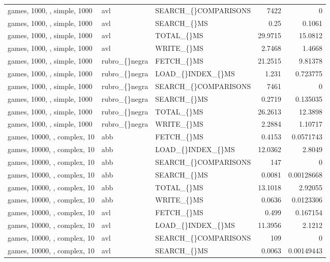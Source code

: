 \begin{longtable}{p{4cm}p{1.4cm}p{2.6cm}rr}
games, 1000, , simple, 1000 & avl & SEARCH\_\allowbreak\{\}COMPARISONS & 7422 & 0\\
games, 1000, , simple, 1000 & avl & SEARCH\_\allowbreak\{\}MS & 0.25 & 0.1061\\
games, 1000, , simple, 1000 & avl & TOTAL\_\allowbreak\{\}MS & 29.9715 & 15.0812\\
games, 1000, , simple, 1000 & avl & WRITE\_\allowbreak\{\}MS & 2.7468 & 1.4668\\
games, 1000, , simple, 1000 & rubro\_\allowbreak\{\}negra & FETCH\_\allowbreak\{\}MS & 21.2515 & 9.81378\\
games, 1000, , simple, 1000 & rubro\_\allowbreak\{\}negra & LOAD\_\allowbreak\{\}INDEX\_\allowbreak\{\}MS & 1.231 & 0.723775\\
games, 1000, , simple, 1000 & rubro\_\allowbreak\{\}negra & SEARCH\_\allowbreak\{\}COMPARISONS & 7461 & 0\\
games, 1000, , simple, 1000 & rubro\_\allowbreak\{\}negra & SEARCH\_\allowbreak\{\}MS & 0.2719 & 0.135035\\
games, 1000, , simple, 1000 & rubro\_\allowbreak\{\}negra & TOTAL\_\allowbreak\{\}MS & 26.2613 & 12.3898\\
games, 1000, , simple, 1000 & rubro\_\allowbreak\{\}negra & WRITE\_\allowbreak\{\}MS & 2.2884 & 1.10717\\
games, 10000, , complex, 10 & abb & FETCH\_\allowbreak\{\}MS & 0.4153 & 0.0571743\\
games, 10000, , complex, 10 & abb & LOAD\_\allowbreak\{\}INDEX\_\allowbreak\{\}MS & 12.0362 & 2.8049\\
games, 10000, , complex, 10 & abb & SEARCH\_\allowbreak\{\}COMPARISONS & 147 & 0\\
games, 10000, , complex, 10 & abb & SEARCH\_\allowbreak\{\}MS & 0.0081 & 0.00128668\\
games, 10000, , complex, 10 & abb & TOTAL\_\allowbreak\{\}MS & 13.1018 & 2.92055\\
games, 10000, , complex, 10 & abb & WRITE\_\allowbreak\{\}MS & 0.0636 & 0.0123306\\
games, 10000, , complex, 10 & avl & FETCH\_\allowbreak\{\}MS & 0.499 & 0.167154\\
games, 10000, , complex, 10 & avl & LOAD\_\allowbreak\{\}INDEX\_\allowbreak\{\}MS & 11.3956 & 2.1212\\
games, 10000, , complex, 10 & avl & SEARCH\_\allowbreak\{\}COMPARISONS & 109 & 0\\
games, 10000, , complex, 10 & avl & SEARCH\_\allowbreak\{\}MS & 0.0063 & 0.00149443\\

\end{longtable}
